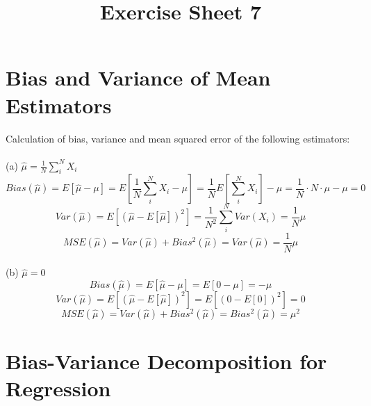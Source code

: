 \documentclass[]{article}
\begin{document}
\title{Exercise Sheet 7}
\maketitle

\section{Bias and Variance of Mean Estimators}	
Calculation of bias, variance and mean squared error of the following estimators:
\paragraph{}
(a) $\hat{\mu} = \frac{1}{N} \sum_i^N X_i$
	\begin{displaymath}
	Bias(\hat{\mu}) = E [\hat{\mu}-\mu] = E [\frac{1}{N} \sum_i^N X_i - \mu]
	= \frac{1}{N} E[\sum_i^N X_i] - \mu = \frac{1}{N} \cdot N \cdot \mu - \mu = 0
	\end{displaymath}
	\begin{displaymath}
	Var(\hat{\mu}) = E [(\hat{\mu} - E[\hat{\mu}])^2] = \frac{1}{N^2} \sum_i^N Var(X_i) = \frac{1}{N} \mu
	\end{displaymath}
	\begin{displaymath}
	MSE(\hat{\mu}) = Var(\hat{\mu}) + Bias^2(\hat{\mu}) = Var(\hat{\mu}) = \frac{1}{N} \mu
	\end{displaymath}
\paragraph{}
(b) $\hat{\mu} = 0$
	\begin{displaymath}
	Bias(\hat{\mu}) = E [\hat{\mu}-\mu] = E [0 - \mu]
	= - \mu
	\end{displaymath}
	\begin{displaymath}
	Var(\hat{\mu}) = E [(\hat{\mu} - E[\hat{\mu}])^2] = E [(0 - E[0])^2] = 0
	\end{displaymath}
	\begin{displaymath}
	MSE(\hat{\mu}) = Var(\hat{\mu}) + Bias^2(\hat{\mu}) = Bias^2(\hat{\mu}) = \mu^2
	\end{displaymath}
\paragraph{}
\section{Bias-Variance Decomposition for Regression}
\end{document}
